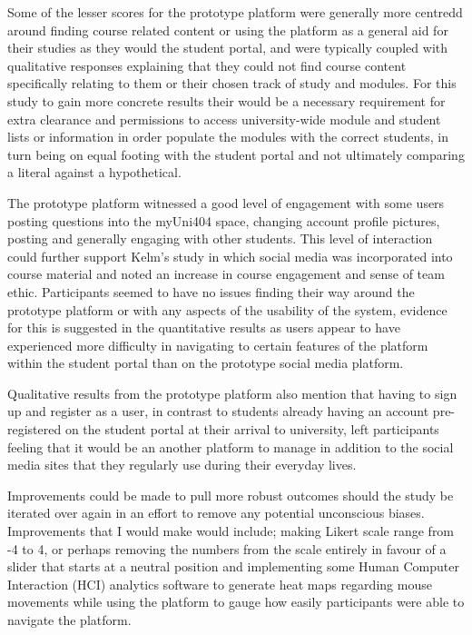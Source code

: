 \documentclass[lettersize,journal]{IEEEtran}
\begin{document}
Some of the lesser scores for the prototype platform were generally more centredd around finding course related content or using the platform as a general aid for their studies as they would the
student portal, and were typically coupled with qualitative responses explaining that they could not find course content specifically relating to them or their chosen track of study and modules.
For this study to gain more concrete results their would be a necessary requirement for extra clearance and permissions to access university-wide module and student lists or information in order
populate the modules with the correct students, in turn being on equal footing with the student portal and not ultimately comparing a literal against a hypothetical.

The prototype platform witnessed a good level of engagement with some users posting questions into the myUni404 space, changing account profile pictures, posting and generally engaging with other
students. This level of interaction could further support Kelm's \cite{Kelm2011} study in which social media was incorporated into course material and noted an increase in course engagement and sense of
team ethic. Participants seemed to have no issues finding their way around the prototype platform or with any aspects of the usability of the system, evidence for this is suggested in the quantitative
results as users appear to have experienced more difficulty in navigating to certain features of the platform within the student portal than on the prototype social media platform.

Qualitative results from the prototype platform also mention that having to sign up and register as a user, in contrast to students already having an account pre-registered on the student portal
at their arrival to university, left participants feeling that it would be an another platform to manage in addition to the social media sites that they regularly use during their everyday lives.

Improvements could be made to pull more robust outcomes should the study be iterated over again in an effort to remove any potential unconscious biases. Improvements that I would make would include; making
Likert scale range from -4 to 4, or perhaps removing the numbers from the scale entirely in favour of a slider that starts at a neutral position and implementing some Human Computer Interaction
(HCI) analytics software to generate heat maps regarding mouse movements while using the platform to gauge how easily participants were able to navigate the platform.
\end{document}
